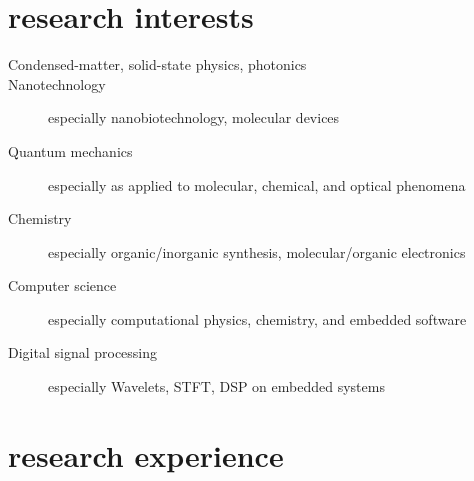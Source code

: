 \documentclass[overlapped,line,10pt,letterpaper]{res}
\begin{document}
\begin{resume}
\section{research interests}
\begin{description}
\item[Condensed-matter, solid-state physics, photonics]
\item[Nanotechnology] especially nanobiotechnology, molecular devices
\item[Quantum mechanics] especially as applied to molecular, chemical, and optical phenomena
\item[Chemistry] especially organic/inorganic synthesis, molecular/organic electronics
\item[Computer science] especially computational physics, chemistry, and embedded software
\item[Digital signal processing] especially Wavelets, STFT, DSP on embedded systems
\end{description}

\section{research experience}


\end{resume}
\end{document}
